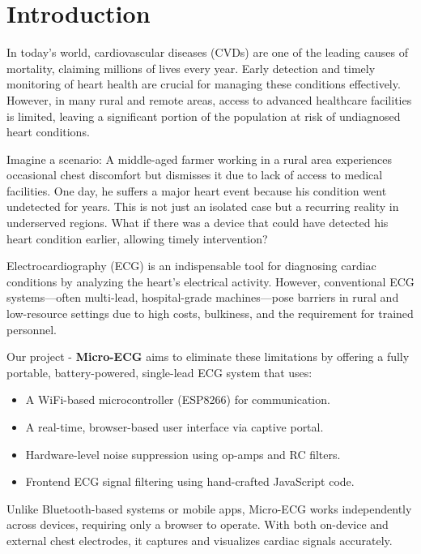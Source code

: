 \chapter{Introduction}
In today’s world, cardiovascular diseases (CVDs) are one of the leading causes of mortality, claiming millions of lives every year. Early detection and timely monitoring of heart health are crucial for managing these conditions effectively. However, in many rural and remote areas, access to advanced healthcare facilities is limited, leaving a significant portion of the population at risk of undiagnosed heart conditions. 

Imagine a scenario: A middle-aged farmer working in a rural area experiences occasional chest discomfort but dismisses it due to lack of access to medical facilities. One day, he suffers a major heart event because his condition went undetected for years. This is not just an isolated case but a recurring reality in underserved regions. What if there was a device that could have detected his heart condition earlier, allowing timely intervention?  

Electrocardiography (ECG) is an indispensable tool for diagnosing cardiac conditions by analyzing the heart's electrical activity. However, conventional ECG systems—often multi-lead, hospital-grade machines—pose barriers in rural and low-resource settings due to high costs, bulkiness, and the requirement for trained personnel.

Our project - \textbf{Micro-ECG} aims to eliminate these limitations by offering a fully portable, battery-powered, single-lead ECG system that uses:
\begin{itemize}
    \item A WiFi-based microcontroller (ESP8266) for communication.
    \item A real-time, browser-based user interface via captive portal.
    \item Hardware-level noise suppression using op-amps and RC filters.
    \item Frontend ECG signal filtering using hand-crafted JavaScript code.
\end{itemize}

Unlike Bluetooth-based systems or mobile apps, Micro-ECG works independently across devices, requiring only a browser to operate. With both on-device and external chest electrodes, it captures and visualizes cardiac signals accurately.






